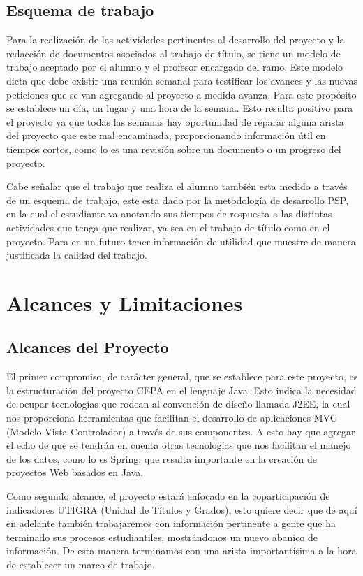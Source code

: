 \documentclass[a4paper,12pt,openany,oneside]{book}
\begin{document}
\section{Esquema de trabajo}
Para la realización de las actividades pertinentes al desarrollo del proyecto y la redacción de documentos asociados al trabajo de título, se tiene un modelo de trabajo aceptado por el alumno y el profesor encargado del ramo. Este modelo dicta que debe existir una reunión semanal para testificar los avances y las nuevas peticiones que se van agregando al proyecto a medida avanza. Para este propósito se establece un día, un lugar y una hora de la semana. Esto resulta positivo para el proyecto ya que todas las semanas hay oportunidad de reparar alguna arista del proyecto que este mal encaminada, proporcionando información útil en tiempos cortos, como lo es una revisión sobre un documento o un progreso del proyecto.

Cabe señalar que el trabajo que realiza el alumno también esta medido a través de un esquema de trabajo, este esta dado por la metodología de desarrollo PSP, en la cual el estudiante va anotando sus tiempos de respuesta a las distintas actividades que tenga que realizar, ya sea en el trabajo de título como en el proyecto. Para en un futuro tener información de utilidad que muestre de manera justificada la calidad del trabajo.
\chapter{Alcances y Limitaciones}
\thispagestyle{empty}
\section{Alcances del Proyecto}
El primer compromiso, de carácter general, que se establece para este proyecto, es la estructuración del proyecto CEPA en el lenguaje Java. Esto indica la necesidad de ocupar tecnologías que rodean al convención de diseño llamada J2EE, la cual nos proporciona herramientas que facilitan el desarrollo de aplicaciones MVC (Modelo Vista Controlador) a través de sus componentes. A esto hay que agregar el echo de que se tendrán en cuenta otras tecnologías que nos facilitan el manejo de los datos, como lo es Spring, que resulta importante en la creación de proyectos Web basados en Java.

Como segundo alcance, el proyecto estará enfocado en la coparticipación de indicadores UTIGRA (Unidad de Títulos y Grados), esto quiere decir que de aquí en adelante también trabajaremos con información pertinente a gente que ha terminado sus procesos estudiantiles, mostrándonos un nuevo abanico de información. De esta manera terminamos con una arista importantísima a la hora de establecer un marco de trabajo.
\end{document}
